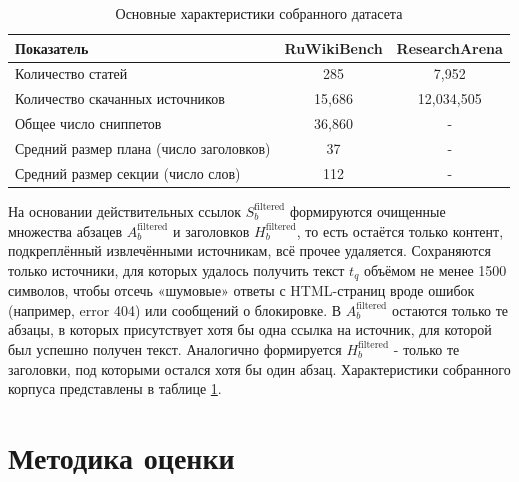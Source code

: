 \documentclass{article}
\begin{document}
\begin{table}[ht!]
  \centering
  \caption{Основные характеристики собранного датасета}
  \label{tab:dataset}
  \begin{tabular}{lcc}
    \hline
    \textbf{Показатель} & \textbf{RuWikiBench} & \textbf{ResearchArena} \\
    \hline
    Количество статей                             & 285 & 7,952\\
    \hline
    Количество скачанных источников               & 15,686 & 12,034,505\\
    \hline
    Общее число сниппетов                         & 36,860 & -\\
    \hline
    Средний размер плана (число заголовков)       & 37 & -\\
    \hline
    Средний размер секции (число слов)            & 112 & -\\
    \hline
  \end{tabular}
\end{table}

На основании действительных ссылок \(S_b^{\mathrm{filtered}}\) формируются очищенные множества абзацев \(A_b^{\mathrm{filtered}}\) и заголовков \(H_b^{\mathrm{filtered}}\), 
то есть остаётся только контент, подкреплённый извлечёнными источникам, всё прочее удаляется. 
Сохраняются только источники, для которых удалось получить текст \(t_q\) объёмом не менее 1500 символов,
чтобы отсечь «шумовые» ответы с HTML-страниц вроде ошибок (например, error 404) или сообщений о блокировке. 
В \(A_b^{\mathrm{filtered}}\) остаются только те абзацы, в которых присутствует хотя бы одна ссылка на источник, для которой был успешно получен текст.
Аналогично формируется \(H_b^{\mathrm{filtered}}\) - только те заголовки, под которыми остался хотя бы один абзац.
Характеристики собранного корпуса представлены в таблице \ref{tab:dataset}.

\section*{Методика оценки}
\end{document}
